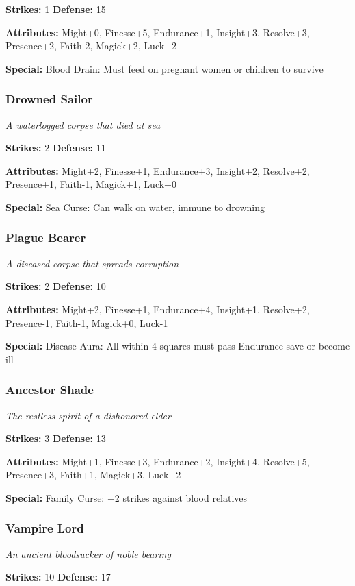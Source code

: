 \documentclass[10pt,twoside]{article}
\begin{document}
\textbf{Strikes:} 1 \quad \textbf{Defense:} 15

\textbf{Attributes:} Might+0, Finesse+5, Endurance+1, Insight+3, Resolve+3, Presence+2, Faith-2, Magick+2, Luck+2

\textbf{Special:} Blood Drain: Must feed on pregnant women or children to survive

\subsubsection{Drowned Sailor}
\textit{A waterlogged corpse that died at sea}

\textbf{Strikes:} 2 \quad \textbf{Defense:} 11

\textbf{Attributes:} Might+2, Finesse+1, Endurance+3, Insight+2, Resolve+2, Presence+1, Faith-1, Magick+1, Luck+0

\textbf{Special:} Sea Curse: Can walk on water, immune to drowning

\subsubsection{Plague Bearer}
\textit{A diseased corpse that spreads corruption}

\textbf{Strikes:} 2 \quad \textbf{Defense:} 10

\textbf{Attributes:} Might+2, Finesse+1, Endurance+4, Insight+1, Resolve+2, Presence-1, Faith-1, Magick+0, Luck-1

\textbf{Special:} Disease Aura: All within 4 squares must pass Endurance save or become ill

\subsubsection{Ancestor Shade}
\textit{The restless spirit of a dishonored elder}

\textbf{Strikes:} 3 \quad \textbf{Defense:} 13

\textbf{Attributes:} Might+1, Finesse+3, Endurance+2, Insight+4, Resolve+5, Presence+3, Faith+1, Magick+3, Luck+2

\textbf{Special:} Family Curse: +2 strikes against blood relatives

\subsubsection{Vampire Lord}
\textit{An ancient bloodsucker of noble bearing}

\textbf{Strikes:} 10 \quad \textbf{Defense:} 17
\end{document}
